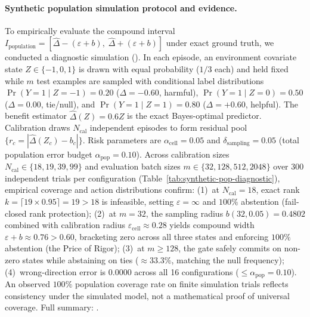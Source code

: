 \paragraph{Synthetic population simulation protocol and evidence.}
To empirically evaluate the compound interval $I_{\mathrm{population}} = [\widehat\Delta - (\varepsilon + b), \; \widehat\Delta + (\varepsilon + b)]$
under exact ground truth, we conducted a diagnostic simulation ().
In each episode, an environment covariate state $Z \in \{-1, 0, 1\}$ is drawn with equal probability ($1/3$ each) and held fixed while $m$ test examples are sampled with conditional label distributions
$\Pr(Y=1 \mid Z=-1)=0.20$ ($\Delta = -0.60$, harmful), $\Pr(Y=1 \mid Z=0)=0.50$ ($\Delta = 0.00$, tie/null), and $\Pr(Y=1 \mid Z=1)=0.80$ ($\Delta = +0.60$, helpful).
The benefit estimator $\widehat\Delta(Z) = 0.6Z$ is the exact Bayes-optimal predictor.
Calibration draws $N_{\mathrm{cal}}$ independent episodes to form residual pool $\{r_c = |\widehat\Delta(Z_c) - b_c|\}$.
Risk parameters are $\alpha_{\mathrm{cell}} = 0.05$ and $\delta_{\mathrm{sampling}} = 0.05$ (total population error budget $\alpha_{\mathrm{pop}} = 0.10$).
Across calibration sizes $N_{\mathrm{cal}} \in \{18, 19, 39, 99\}$ and evaluation batch sizes $m \in \{32, 128, 512, 2048\}$ over 300 independent trials per configuration
(Table~\ref{tab:synthetic-pop-diagnostic}), empirical coverage and action distributions confirm:
(1)~at $N_{\mathrm{cal}}=18$, exact rank $k = \lceil 19 \times 0.95 \rceil = 19 > 18$ is infeasible, setting $\varepsilon = \infty$ and $100\%$ abstention (fail-closed rank protection);
(2)~at $m=32$, the sampling radius $b(32, 0.05) = 0.4802$ combined with calibration radius $\varepsilon_{\mathrm{cell}} \approx 0.28$ yields compound width $\varepsilon + b \approx 0.76 > 0.60$, bracketing zero across all three states and enforcing $100\%$ abstention (the Price of Rigor);
(3)~at $m \ge 128$, the gate safely commits on non-zero states while abstaining on ties ($\approx 33.3\%$, matching the null frequency);
(4)~wrong-direction error is $0.0000$ across all 16 configurations ($\le \alpha_{\mathrm{pop}} = 0.10$).
An observed $100\%$ population coverage rate on finite simulation trials reflects consistency under the simulated model, not a mathematical proof of universal coverage.
Full summary: .

